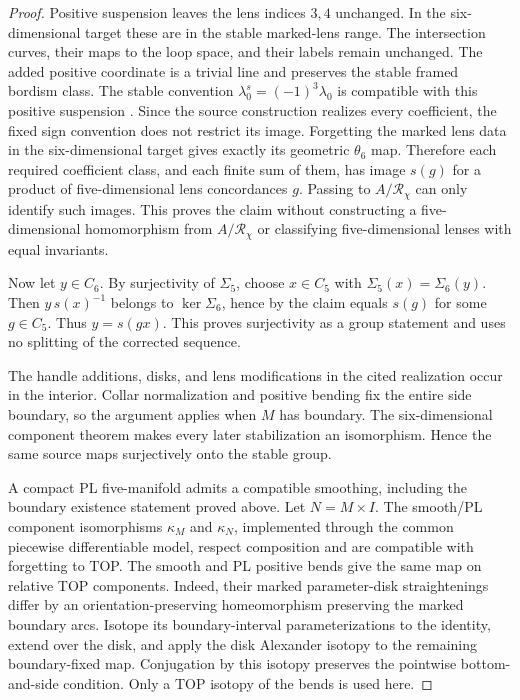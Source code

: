 \begin{proof}
Positive suspension leaves the lens indices $3,4$ unchanged.
In the six-dimensional target these are in the stable marked-lens
range. The intersection curves, their maps to the loop space, and
their labels remain unchanged. The added positive coordinate is
a trivial line and preserves the stable framed bordism class. The stable convention
$\lambda^s_0=(-1)^3\lambda_0$ is compatible with this positive
suspension
\cite[Sections~4.1--4.2, pp.~8--9]{Igusa2021Dimension3}.
Since the source construction realizes every coefficient, the fixed
sign convention does not restrict its image. Forgetting the marked
lens data in the six-dimensional target gives exactly its geometric
$\theta_6$ map. Therefore each required coefficient class, and each
finite sum of them, has image $s(g)$ for a product of
five-dimensional lens concordances $g$. Passing to $A/\mathcal R_\chi$ can only
identify such images. This proves the claim without constructing a
five-dimensional homomorphism from $A/\mathcal R_\chi$ or classifying
five-dimensional lenses with equal invariants.

Now let $y\in C_6$. By surjectivity of $\Sigma_5$, choose
$x\in C_5$ with $\Sigma_5(x)=\Sigma_6(y)$. Then
$y\,s(x)^{-1}$ belongs to $\ker\Sigma_6$, hence by the claim
equals $s(g)$ for some $g\in C_5$. Thus $y=s(gx)$.
This proves surjectivity as a group statement and uses no splitting
of the corrected sequence.

The handle additions, disks, and lens modifications in the cited
realization occur in the interior. Collar normalization and positive
bending fix the entire side boundary, so the argument applies when
$M$ has boundary. The six-dimensional component theorem makes every
later stabilization an isomorphism. Hence the same source maps
surjectively onto the stable group.

A compact PL five-manifold admits a compatible smoothing, including
the boundary existence statement proved above. Let $N=M\times I$.
The smooth/PL component isomorphisms $\kappa_M$ and $\kappa_N$,
implemented through the common piecewise differentiable model,
respect composition and are compatible with forgetting to TOP.
The smooth and PL positive bends give the same map on relative
TOP components. Indeed, their marked parameter-disk straightenings
differ by an orientation-preserving homeomorphism preserving the
marked boundary arcs. Isotope its boundary-interval parameterizations
to the identity, extend over the disk, and apply the disk Alexander
isotopy to the remaining boundary-fixed map. Conjugation by this
isotopy preserves the pointwise bottom-and-side condition.
Only a TOP isotopy of the bends is used here.


\end{proof}
